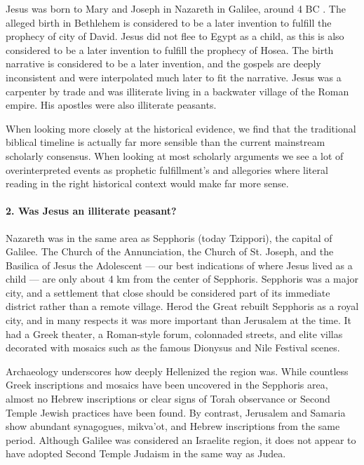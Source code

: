 Jesus was born to Mary and Joseph in Nazareth in Galilee, around 4 BC .
The alleged birth in Bethlehem is considered to be a later invention to fulfill the prophecy of city of David.
Jesus did not flee to Egypt as a child, as this is also considered to be a later invention to fulfill the prophecy of Hosea.
The birth narrative is considered to be a later invention, and the gospels are deeply inconsistent and were interpolated much later to fit the narrative.
Jesus was a carpenter by trade and was illiterate living in a backwater village of the Roman empire.
His apostles were also illiterate peasants.

When looking more closely at the historical evidence, we find that the traditional biblical timeline is actually far more sensible than the current mainstream scholarly consensus.
When looking at most scholarly arguments we see a lot of overinterpreted events as prophetic fulfillment's and allegories where literal reading in the right historical context would make far more sense.

\paragraph{2. Was Jesus an illiterate peasant?}\label{par:nazareth-was-not-a-backwater-village.}

Nazareth was in the same area as Sepphoris (today Tzippori), the capital of Galilee.
The Church of the Annunciation, the Church of St. Joseph, and the Basilica of Jesus the Adolescent — our best indications of where Jesus lived as a child — are only about 4 km from the center of Sepphoris.
Sepphoris was a major city, and a settlement that close should be considered part of its immediate district rather than a remote village.
Herod the Great rebuilt Sepphoris as a royal city, and in many respects it was more important than Jerusalem at the time.
It had a Greek theater, a Roman-style forum, colonnaded streets, and elite villas decorated with mosaics such as the famous Dionysus and Nile Festival scenes.

Archaeology underscores how deeply Hellenized the region was.
While countless Greek inscriptions and mosaics have been uncovered in the Sepphoris area, almost no Hebrew inscriptions or clear signs of Torah observance or Second Temple Jewish practices have been found.
By contrast, Jerusalem and Samaria show abundant synagogues, mikva’ot, and Hebrew inscriptions from the same period.
Although Galilee was considered an Israelite region, it does not appear to have adopted Second Temple Judaism in the same way as Judea.

